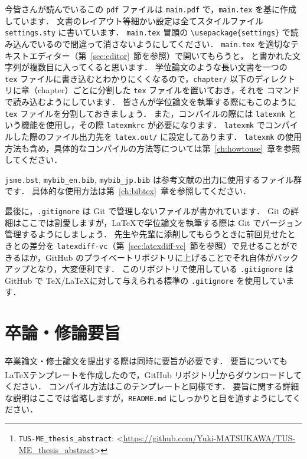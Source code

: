 今皆さんが読んでいるこの \verb|pdf| ファイルは \verb|main.pdf| で，\verb|main.tex| を基に作成しています．
文書のレイアウト等細かい設定は全てスタイルファイル \verb|settings.sty| に書いています．
\verb|main.tex| 冒頭の \verb|\usepackage{settings}| で読み込んでいるので間違って消さないようにしてください．
\verb|main.tex| を適切なテキストエディター（第~\ref{sec:editor}~節を参照）で開いてもらうと，\verb|| と書かれた文字列が複数目に入ってくると思います．
学位論文のような長い文書を一つの \verb|tex| ファイルに書き込むとわかりにくくなるので，\verb|chapter/| 以下のディレクトリに章（chapter）ごとに分割した \verb|tex| ファイルを置いておき，それを \verb|| コマンドで読み込むようにしています．
皆さんが学位論文を執筆する際にもこのように \verb|tex| ファイルを分割しておきましょう．
また，コンパイルの際には \verb|latexmk| という機能を使用し，その際 \verb|latexmkrc| が必要になります．
\verb|latexmk| でコンパイルした際のファイル出力先を \verb|latex.out/| に設定してあります．
\verb|latexmk| の使用方法も含め，具体的なコンパイルの方法等については第~\ref{ch:howtouse}~章を参照してください．

\verb|jsme.bst|, \verb|mybib_en.bib|, \verb|mybib_jp.bib| は参考文献の出力に使用するファイル群です．
具体的な使用方法は第~\ref{ch:bibtex}~章を参照してください．

最後に，\verb|.gitignore| は Git で管理しないファイルが書かれています．
Git の詳細はここでは割愛しますが，\LaTeX で学位論文を執筆する際は Git でバージョン管理するようにしましょう．
先生や先輩に添削してもらうときに前回見せたときとの差分を \verb|latexdiff-vc|（第~\ref{sec:latexdiff-vc}~節を参照）で見せることができるほか，GitHub のプライベートリポジトリに上げることでそれ自体がバックアップとなり，大変便利です．
このリポジトリで使用している \verb|.gitignore| は GitHub で \TeX/\LaTeX に対して与えられる標準の \verb|.gitignore| を使用しています．

\section{卒論・修論要旨}
\label{sec:abstract}

卒業論文・修士論文を提出する際は同時に要旨が必要です．
要旨についても \LaTeX テンプレートを作成したので，GitHub リポジトリ\footnote{\texttt{TUS-ME\_thesis\_abstract}: \textless\url{https://github.com/Yuki-MATSUKAWA/TUS-ME_thesis_abstract}\textgreater}からダウンロードしてください．
コンパイル方法はこのテンプレートと同様です．
要旨に関する詳細な説明はここでは省略しますが，\verb|README.md| にしっかりと目を通すようにしてください．

